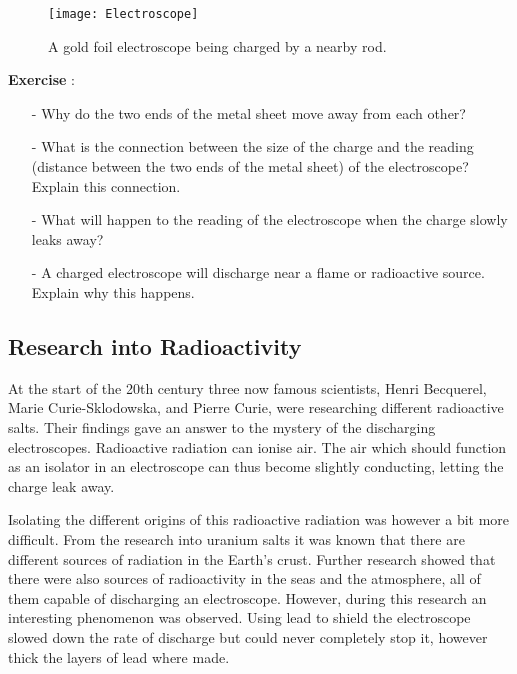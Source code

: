 \begin{figure}\begin{center}
\texttt{[image: Electroscope]}
\caption{A gold foil electroscope being charged by a nearby rod.\protect\footnotemark}\label{fig:electroscope}
\end{center}\end{figure}

\begin{shaded}
\textbf{Exercise \theExercise {}} :
\begin{itemize}
\item[-] Why do the two ends of the metal sheet move away from each other?
\item[-] What is the connection between the size of the charge and the reading (distance between the two ends of the metal sheet) of the electroscope? Explain this connection.
\item[-] What will happen to the reading of the electroscope when the charge slowly leaks away?
\item[-] A charged electroscope will discharge near a flame or radioactive source. Explain why this happens.
\end{itemize}\end{shaded}

\subsection{Research into Radioactivity}
At the start of the 20th century three now famous scientists, Henri Becquerel, Marie Curie-Sklodowska, and Pierre Curie, were researching different radioactive salts. Their findings gave an answer to the mystery of the discharging electroscopes. Radioactive radiation can ionise air. The air which should function as an isolator in an electroscope can thus become slightly conducting, letting the charge leak away.

Isolating the different origins of this radioactive radiation was however a bit more difficult. From the research into uranium salts it was known that there are different sources of radiation in the Earth's crust. Further research showed that there were also sources of radioactivity in the seas and the atmosphere, all of them capable of discharging an electroscope. However, during this research an interesting phenomenon was observed. Using lead to shield the electroscope slowed down the rate of discharge but could never completely stop it, however thick the layers of lead where made.


